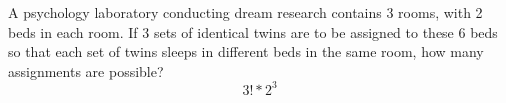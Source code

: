 \item A psychology laboratory conducting dream research contains 3 rooms, with 2 beds in each room. If 3 sets of identical twins are to be assigned to these 6 beds so that each set of twins sleeps in different beds in the same room, how many assignments are possible?
\[ 3! * 2^3 \]